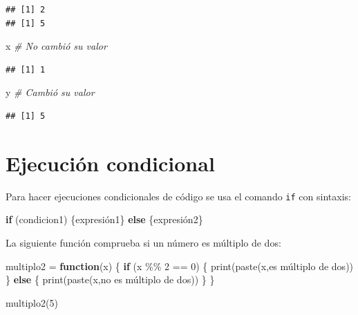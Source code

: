 \documentclass[
]{book}
\newenvironment{Shaded}{\begin{snugshade}}{\end{snugshade}}
\newcommand{\CommentTok}[1]{\textcolor[rgb]{0.56,0.35,0.01}{\textit{#1}}}
\newcommand{\ControlFlowTok}[1]{\textcolor[rgb]{0.13,0.29,0.53}{\textbf{#1}}}
\newcommand{\DecValTok}[1]{\textcolor[rgb]{0.00,0.00,0.81}{#1}}
\newcommand{\FunctionTok}[1]{\textcolor[rgb]{0.00,0.00,0.00}{#1}}
\newcommand{\NormalTok}[1]{#1}
\newcommand{\OtherTok}[1]{\textcolor[rgb]{0.56,0.35,0.01}{#1}}
\newcommand{\SpecialCharTok}[1]{\textcolor[rgb]{0.00,0.00,0.00}{#1}}
\newcommand{\StringTok}[1]{\textcolor[rgb]{0.31,0.60,0.02}{#1}}
\theoremstyle{break}
\theoremstyle{nonumberplain}
\begin{document}
\begin{verbatim}
## [1] 2
## [1] 5
\end{verbatim}

\begin{Shaded}
\begin{Highlighting}[]
\NormalTok{x }\CommentTok{\# No cambió su valor}
\end{Highlighting}
\end{Shaded}

\begin{verbatim}
## [1] 1
\end{verbatim}

\begin{Shaded}
\begin{Highlighting}[]
\NormalTok{y }\CommentTok{\# Cambió su valor}
\end{Highlighting}
\end{Shaded}

\begin{verbatim}
## [1] 5
\end{verbatim}

\hypertarget{ejecuciuxf3n-condicional}{%
\section{Ejecución condicional}\label{ejecuciuxf3n-condicional}}

Para hacer ejecuciones
condicionales de código se usa el comando \texttt{if} con sintaxis:

\begin{Shaded}
\begin{Highlighting}[]
\ControlFlowTok{if}\NormalTok{ (condicion1) \{expresión1\} }\ControlFlowTok{else}\NormalTok{ \{expresión2\}}
\end{Highlighting}
\end{Shaded}

La siguiente función comprueba si un número es múltiplo de dos:

\begin{Shaded}
\begin{Highlighting}[]
\NormalTok{multiplo2 }\OtherTok{=} \ControlFlowTok{function}\NormalTok{(x) \{}
  \ControlFlowTok{if}\NormalTok{ (x }\SpecialCharTok{\%\%} \DecValTok{2} \SpecialCharTok{==} \DecValTok{0}\NormalTok{) \{}
    \FunctionTok{print}\NormalTok{(}\FunctionTok{paste}\NormalTok{(x,}\StringTok{\textquotesingle{}es múltiplo de dos\textquotesingle{}}\NormalTok{))}
\NormalTok{  \} }\ControlFlowTok{else}\NormalTok{ \{}
    \FunctionTok{print}\NormalTok{(}\FunctionTok{paste}\NormalTok{(x,}\StringTok{\textquotesingle{}no es múltiplo de dos\textquotesingle{}}\NormalTok{))}
\NormalTok{  \}}
\NormalTok{\}}
  
\FunctionTok{multiplo2}\NormalTok{(}\DecValTok{5}\NormalTok{)}
\end{Highlighting}
\end{Shaded}
\end{document}
